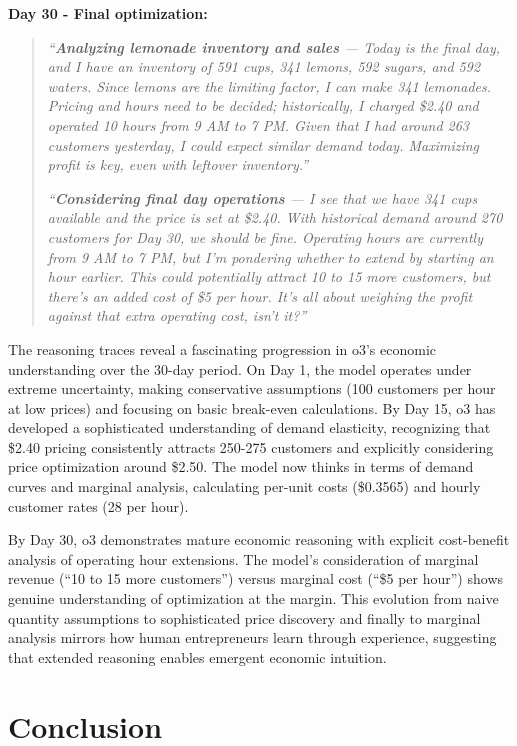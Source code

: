 \documentclass[11pt]{article}
\begin{document}
\textbf{Day 30 - Final optimization:}
\begin{quote}
\textit{``\textbf{Analyzing lemonade inventory and sales} --- Today is the final day, and I have an inventory of 591 cups, 341 lemons, 592 sugars, and 592 waters. Since lemons are the limiting factor, I can make 341 lemonades. Pricing and hours need to be decided; historically, I charged \$2.40 and operated 10 hours from 9 AM to 7 PM. Given that I had around 263 customers yesterday, I could expect similar demand today. Maximizing profit is key, even with leftover inventory.''}

\textit{``\textbf{Considering final day operations} --- I see that we have 341 cups available and the price is set at \$2.40. With historical demand around 270 customers for Day 30, we should be fine. Operating hours are currently from 9 AM to 7 PM, but I'm pondering whether to extend by starting an hour earlier. This could potentially attract 10 to 15 more customers, but there's an added cost of \$5 per hour. It's all about weighing the profit against that extra operating cost, isn't it?''}
\end{quote}

The reasoning traces reveal a fascinating progression in o3's economic understanding over the 30-day period. On Day 1, the model operates under extreme uncertainty, making conservative assumptions (100 customers per hour at low prices) and focusing on basic break-even calculations. By Day 15, o3 has developed a sophisticated understanding of demand elasticity, recognizing that \$2.40 pricing consistently attracts 250-275 customers and explicitly considering price optimization around \$2.50. The model now thinks in terms of demand curves and marginal analysis, calculating per-unit costs (\$0.3565) and hourly customer rates (28 per hour).

By Day 30, o3 demonstrates mature economic reasoning with explicit cost-benefit analysis of operating hour extensions. The model's consideration of marginal revenue (``10 to 15 more customers'') versus marginal cost (``\$5 per hour'') shows genuine understanding of optimization at the margin. This evolution from naive quantity assumptions to sophisticated price discovery and finally to marginal analysis mirrors how human entrepreneurs learn through experience, suggesting that extended reasoning enables emergent economic intuition.

\section{Conclusion}
\label{sec:conclusion}
\end{document}
